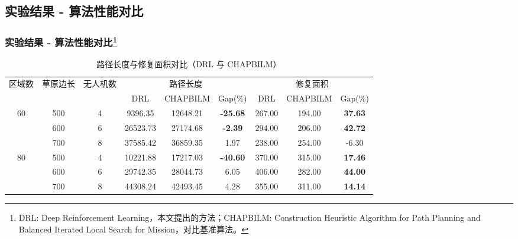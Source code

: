 \documentclass[11pt, aspectratio=169]{beamer}  %
\begin{document}
\subsection{实验结果 - 算法性能对比}
\begin{frame}
	\frametitle{实验结果 - 算法性能对比\footnote{DRL: Deep Reinforcement Learning，本文提出的方法；CHAPBILM: Construction Heuristic Algorithm for Path Planning and Balanced Iterated Local Search for Mission，对比基准算法。}}
	\begin{table}
		\centering
		\caption{路径长度与修复面积对比（DRL 与 CHAPBILM）}
		\small %
		\setlength{\tabcolsep}{3pt}
		\begin{tabular}{ccc ccc ccc}
			\toprule
			\multirow{2}{*}{区域数} & \multirow{2}{*}{草原边长} & \multirow{2}{*}{ 无人机数} & \multicolumn{3}{c}{路径长度} & \multicolumn{3}{c}{修复面积}                                                        \\
			\cmidrule(lr){4-6}\cmidrule(lr){7-9}
			                     &                       &                        & DRL                      & CHAPBILM                 & Gap(\%)         & DRL    & CHAPBILM & Gap(\%)        \\
			\midrule
			\multirow{3}{*}{60}
			                     & 500                   & 4                      & 9396.35                  & 12648.21                 & \textbf{-25.68} & 267.00 & 194.00   & \textbf{37.63} \\
			                     & 600                   & 6                      & 26523.73                 & 27174.68                 & \textbf{-2.39}  & 294.00 & 206.00   & \textbf{42.72} \\
			                     & 700                   & 8                      & 37585.42                 & 36859.35                 & 1.97            & 238.00 & 254.00   & -6.30          \\
			\midrule
			\multirow{3}{*}{80}
			                     & 500                   & 4                      & 10221.88                 & 17217.03                 & \textbf{-40.60} & 370.00 & 315.00   & \textbf{17.46} \\
			                     & 600                   & 6                      & 29742.35                 & 28044.73                 & 6.05            & 406.00 & 282.00   & \textbf{44.00} \\
			                     & 700                   & 8                      & 44308.24                 & 42493.45                 & 4.28            & 355.00 & 311.00   & \textbf{14.14} \\
			\bottomrule
		\end{tabular}
		\label{tab:combined_comparison}
	\end{table}
\end{frame}
\end{document}
